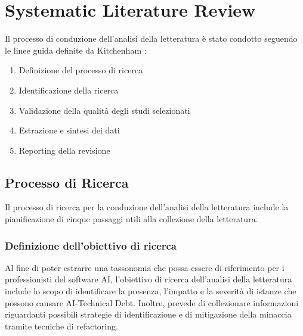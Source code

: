 \section{Systematic Literature Review}
Il processo di conduzione dell'analisi della letteratura è stato condotto seguendo le linee guida definite da Kitchenham \cite{kitchenhamSLR}:
\begin{enumerate}
    \item Definizione del processo di ricerca
    \item Identificazione della ricerca
    \item Validazione della qualità degli studi selezionati
    \item Estrazione e sintesi dei dati
    \item Reporting della revisione
\end{enumerate}

\subsection{Processo di Ricerca}

Il processo di ricerca per la conduzione dell'analisi della letteratura include la pianificazione di cinque passaggi utili alla collezione della letteratura.

\subsubsection{Definizione dell'obiettivo di ricerca}
Al fine di poter estrarre una tassonomia che possa essere di riferimento per i professionisti del software AI, l'obiettivo di ricerca dell'analisi della letteratura include lo scopo di identificare la presenza, l'impatto e la severità di istanze che possono causare AI-Technical Debt.
Inoltre, prevede di collezionare informazioni riguardanti possibili strategie di identificazione e di mitigazione della minaccia tramite tecniche di refactoring.


